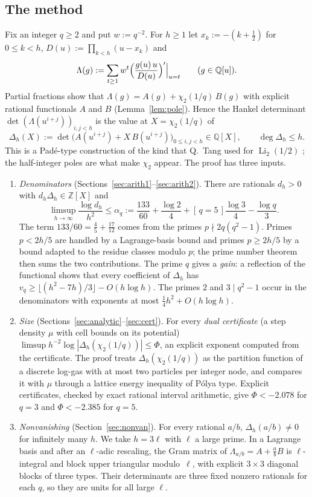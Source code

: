 \documentclass[11pt]{amsart}
\theoremstyle{definition}
\theoremstyle{remark}
\numberwithin{equation}{section}
\newcommand{\ZZ}{\mathbb{Z}}
\newcommand{\QQ}{\mathbb{Q}}
\newcommand{\ind}[1]{[\,#1\,]}
\newcommand{\Li}{\operatorname{Li}}
\begin{document}
\subsection{The method}\label{sec:method}
Fix an integer $q\ge2$ and put $w:=q^{-2}$. For $h\ge1$ let $x_k:=-(k+\frac12)$ for $0\le k<h$,
$D(u):=\prod_{k<h}(u-x_k)$ and
\begin{equation}\label{eq:Lambda}
  \Lambda(g):=\sum_{t\ge1}w^t\Bigl(\frac{g(u)\,u}{D(u)}\Bigr)'\Big|_{u=t}\qquad(g\in\QQ[u]).
\end{equation}
Partial fractions show that $\Lambda(g)=A(g)+\chi_2(1/q)\,B(g)$ with explicit rational functionals $A$ and $B$
(Lemma~\ref{lem:pole}). Hence the Hankel determinant $\det(\Lambda(u^{i+j}))_{i,j<h}$ is the value at
$X=\chi_2(1/q)$ of
\[
  \Delta_h(X):=\det\bigl(A(u^{i+j})+X\,B(u^{i+j})\bigr)_{0\le i,j<h}\in\QQ[X],\qquad \deg\Delta_h\le h.
\]
This is a Pad\'e-type construction of the kind that Q.~Tang used for $\Li_2(1/2)$ \cite{TangLi2}; the
half-integer poles are what make $\chi_2$ appear. The proof has three inputs.
\begin{enumerate}
\item \emph{Denominators} (Sections~\ref{sec:arith1}--\ref{sec:arith2}). There are rationals $d_h>0$ with
  $d_h\Delta_h\in\ZZ[X]$ and
  \[
    \limsup_{h\to\infty}\frac{\log d_h}{h^2}\le\alpha_q:=\frac{133}{60}+\frac{\log2}{4}+\ind{q=5}\frac{\log3}{4}-\frac{\log q}{3}.
  \]
  The term $133/60=\frac45+\frac{17}{12}$ comes from the primes $p\nmid 2q(q^2-1)$. Primes $p<2h/5$ are handled
  by a Lagrange-basis bound and primes $p\ge2h/5$ by a bound adapted to the residue classes modulo $p$; the
  prime number theorem then sums the two contributions. The prime $q$ gives a \emph{gain}: a reflection of the functional
  shows that every coefficient of $\Delta_h$ has $v_q\ge\lfloor(h^2-7h)/3\rfloor-O(h\log h)$. The primes $2$ and
  $3\mid q^2-1$ occur in the denominators with exponents at most $\frac14h^2+O(h\log h)$.
\item \emph{Size} (Sections~\ref{sec:analytic}--\ref{sec:cert}). For every \emph{dual certificate} (a step
  density $\mu$ with cell bounds on its potential) $\limsup h^{-2}\log|\Delta_h(\chi_2(1/q))|\le\Phi$, an
  explicit exponent computed from the certificate.
  The proof treats $\Delta_h(\chi_2(1/q))$ as the partition function of a discrete log-gas with at most two
  particles per integer node, and compares it with $\mu$ through a lattice energy inequality of P\'olya type.
  Explicit certificates, checked by exact rational interval arithmetic, give $\Phi<-2.078$ for $q=3$ and
  $\Phi<-2.385$ for $q=5$.
\item \emph{Nonvanishing} (Section~\ref{sec:nonvan}). For every rational $a/b$, $\Delta_h(a/b)\ne0$ for infinitely
  many $h$. We take $h=3\ell$ with $\ell$ a large prime. In a Lagrange basis and after an $\ell$-adic rescaling,
  the Gram matrix of $\Lambda_{a/b}=A+\frac ab B$ is $\ell$-integral and block upper triangular modulo~$\ell$, with
  explicit $3\times3$ diagonal blocks of three types. Their determinants are three fixed nonzero rationals
  for each $q$, so they are units for all large $\ell$.
\end{enumerate}
\end{document}
